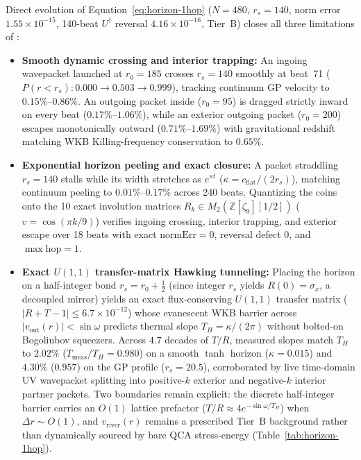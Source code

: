 Direct evolution of Equation~\eqref{eq:horizon-1hop} ($N = 480$, $r_s = 140$, norm error $1.55 \times 10^{-15}$,
140-beat $U^\dagger$ reversal $4.16 \times 10^{-16}$, Tier~B) closes all three limitations of :
\begin{itemize}[itemsep=2pt]
\item \textbf{Smooth dynamic crossing and interior trapping:} An ingoing wavepacket launched at $r_0 = 185$ crosses
$r_s = 140$ smoothly at beat~71 ($P(r < r_s): 0.000 \to 0.503 \to 0.999$), tracking continuum GP velocity to
$0.15\%\text{--}0.86\%$. An outgoing packet inside ($r_0 = 95$) is dragged strictly inward on every beat ($0.17\%\text{--}1.06\%$),
while an exterior outgoing packet ($r_0 = 200$) escapes monotonically outward ($0.71\%\text{--}1.69\%$) with
gravitational redshift matching WKB Killing-frequency conservation to $0.65\%$.
\item \textbf{Exponential horizon peeling and exact  closure:} A packet straddling $r_s = 140$ stalls
while its width stretches as $e^{\kappa t}$ ($\kappa = c_{\mathrm{flat}}/(2 r_s)$), matching continuum peeling to
$0.01\%\text{--}0.17\%$ across 240 beats. Quantizing the coins onto the 10 exact involution matrices
$R_k \in M_2(\mathbb{Z}[\zeta_9][1/2])$ ($v = \cos(\pi k/9)$) verifies ingoing crossing, interior trapping, and
exterior escape over 18 beats with exact  $\mathrm{normErr} = 0$, reversal defect $0$, and
$\max\text{hop} = 1$.
\item \textbf{Exact $U(1,1)$ transfer-matrix Hawking tunneling:} Placing the horizon on a half-integer bond
$r_s = r_0 + \frac{1}{2}$ (since integer $r_s$ yields $R(0) = \sigma_x$, a decoupled mirror) yields an exact
flux-conserving $U(1,1)$ transfer matrix ($|R + T - 1| \le 6.7 \times 10^{-12}$) whose evanescent WKB barrier across
$|v_{\mathrm{out}}(r)| < \sin\omega$ predicts thermal slope $T_H = \kappa/(2\pi)$ without bolted-on Bogoliubov
squeezers. Across $4.7$ decades of $T/R$, measured slopes match $T_H$ to $2.02\%$ ($T_{\mathrm{meas}}/T_H = 0.980$)
on a smooth $\tanh$ horizon ($\kappa = 0.015$) and $4.30\%$ ($0.957$) on the GP profile ($r_s = 20.5$), corroborated by
live time-domain UV wavepacket splitting into positive-$k$ exterior and negative-$k$ interior partner packets. Two
boundaries remain explicit: the discrete half-integer barrier carries an $O(1)$ lattice prefactor
($T/R \approx 4 e^{-\sin\omega / T_H}$) when $\Delta r \sim O(1)$, and $v_{\mathrm{river}}(r)$ remains a prescribed
Tier~B background rather than dynamically sourced by bare QCA stress-energy (Table~\ref{tab:horizon-1hop}).
\end{itemize}

